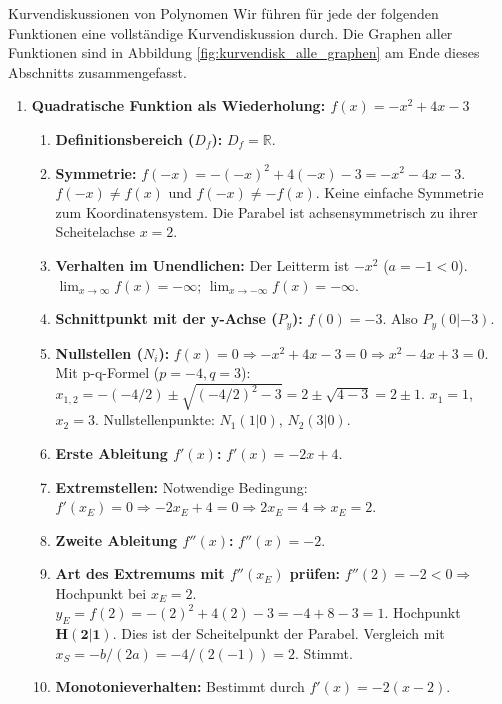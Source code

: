 \begin{loesungsumgebung}{Kurvendiskussionen von Polynomen}
Wir führen für jede der folgenden Funktionen eine vollständige Kurvendiskussion durch. Die Graphen aller Funktionen sind in Abbildung \ref{fig:kurvendisk_alle_graphen} am Ende dieses Abschnitts zusammengefasst.

\begin{enumerate}[label=(\alph*)]
    \item \textbf{Quadratische Funktion als Wiederholung: $f(x) = -x^2 + 4x - 3$}
    \begin{enumerate}[label=\arabic*.]
        \item \textbf{Definitionsbereich ($D_f$):} $D_f = \mathbb{R}$.
        \item \textbf{Symmetrie:}
        $f(-x) = -(-x)^2 + 4(-x) - 3 = -x^2 - 4x - 3$.
        $f(-x) \neq f(x)$ und $f(-x) \neq -f(x)$. Keine einfache Symmetrie zum Koordinatensystem. Die Parabel ist achsensymmetrisch zu ihrer Scheitelachse $x=2$.
        \item \textbf{Verhalten im Unendlichen:} Der Leitterm ist $-x^2$ ($a=-1<0$).
        $\lim_{x \to \infty} f(x) = -\infty$; $\lim_{x \to -\infty} f(x) = -\infty$.
        \item \textbf{Schnittpunkt mit der y-Achse ($P_y$):} $f(0) = -3$. Also $P_y(0|-3)$.
        \item \textbf{Nullstellen ($N_i$):} $f(x)=0 \Rightarrow -x^2 + 4x - 3 = 0 \Rightarrow x^2 - 4x + 3 = 0$.
        Mit p-q-Formel ($p=-4, q=3$): $x_{1,2} = -(-4/2) \pm \sqrt{(-4/2)^2 - 3} = 2 \pm \sqrt{4-3} = 2 \pm 1$.
        $x_1 = 1$, $x_2 = 3$. Nullstellenpunkte: $N_1(1|0)$, $N_2(3|0)$.
        \item \textbf{Erste Ableitung $f'(x)$:} $f'(x) = -2x + 4$.
        \item \textbf{Extremstellen:} Notwendige Bedingung: $f'(x_E)=0 \Rightarrow -2x_E + 4 = 0 \Rightarrow 2x_E=4 \Rightarrow x_E=2$.
        \item \textbf{Zweite Ableitung $f''(x)$:} $f''(x) = -2$.
        \item \textbf{Art des Extremums mit $f''(x_E)$ prüfen:} $f''(2) = -2 < 0 \Rightarrow$ Hochpunkt bei $x_E=2$.
        $y_E = f(2) = -(2)^2 + 4(2) - 3 = -4+8-3=1$. Hochpunkt $\mathbf{H(2|1)}$.
        Dies ist der Scheitelpunkt der Parabel. Vergleich mit $x_S = -b/(2a) = -4/(2(-1)) = 2$. Stimmt.
        \item \textbf{Monotonieverhalten:} Bestimmt durch $f'(x) = -2(x-2)$.

\end{enumerate}
\end{enumerate}
\end{loesungsumgebung}
